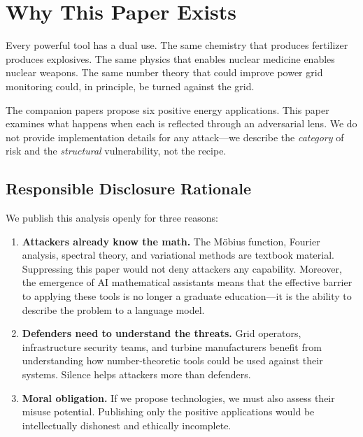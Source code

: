 \documentclass[11pt,a4paper]{article}
\begin{document}
\tableofcontents

\section{Why This Paper Exists}

Every powerful tool has a dual use. The same chemistry that produces
fertilizer produces explosives. The same physics that enables
nuclear medicine enables nuclear weapons. The same number theory
that could improve power grid monitoring could, in principle, be
turned against the grid.

The companion papers propose six positive energy applications. This
paper examines what happens when each is reflected through an
adversarial lens. We do not provide implementation details for any
attack---we describe the \emph{category} of risk and the
\emph{structural} vulnerability, not the recipe.

\subsection{Responsible Disclosure Rationale}

We publish this analysis openly for three reasons:

\begin{enumerate}
  \item \textbf{Attackers already know the math.} The M\"obius
    function, Fourier analysis, spectral theory, and variational
    methods are textbook material. Suppressing this paper would not
    deny attackers any capability. Moreover, the emergence of AI
    mathematical assistants means that the effective barrier to
    applying these tools is no longer a graduate education---it is
    the ability to describe the problem to a language model.

  \item \textbf{Defenders need to understand the threats.} Grid
    operators, infrastructure security teams, and turbine
    manufacturers benefit from understanding how number-theoretic
    tools could be used against their systems. Silence helps
    attackers more than defenders.

  \item \textbf{Moral obligation.} If we propose technologies, we
    must also assess their misuse potential. Publishing only the
    positive applications would be intellectually dishonest and
    ethically incomplete.
\end{enumerate}
\end{document}
